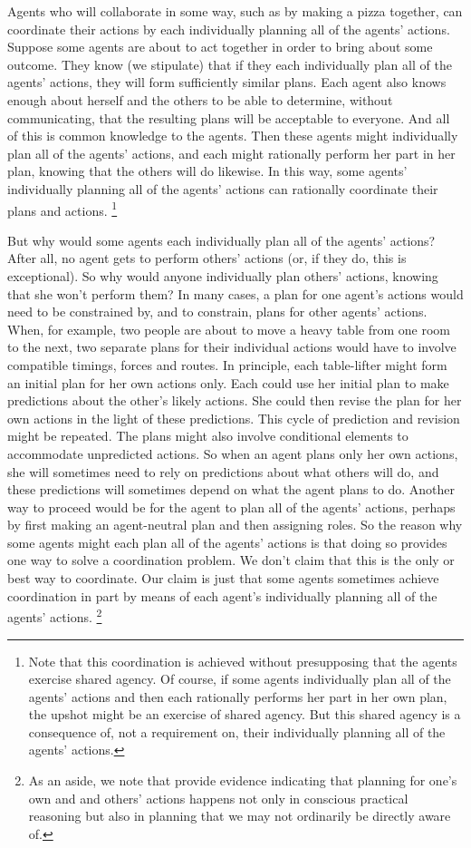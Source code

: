 \documentclass[12pt,\papersize]{extarticle}
\begin{document}
Agents who will collaborate in some way, such as by making a pizza together, can coordinate their actions by each individually planning all of the agents' actions.
Suppose some agents 
	 are about to act together in order to bring about some outcome.
They know (we stipulate) that if they each individually plan all of the agents' actions, they will form sufficiently similar plans.
Each agent also knows enough about herself and the others to be able to determine, without communicating, that the resulting plans will be acceptable to everyone. 
And all of this is common knowledge to the agents.  
Then these agents 
might individually plan all of the agents' actions,
and each might rationally perform her part in her plan, knowing that the others will do likewise.
In this way, 
 some agents' individually planning all of the agents' actions can rationally coordinate their plans and actions.%
\footnote{
Note that this coordination is achieved without presupposing that the agents exercise shared agency.
Of course,
	if some agents individually plan all of the agents' actions
	and then each rationally performs her part in her own plan,
	the upshot might be an exercise of shared agency.
But this shared agency is a consequence of, not a requirement on, their individually planning all of the agents' actions.
}


But why would some agents each individually plan all of the agents' actions?
After all, no agent gets  to perform  others' actions
(or, if they do, this is exceptional).
So why would anyone individually plan others' actions, knowing that she won't perform them?
In many cases, 
a plan for one agent's actions would need to be constrained by, and to constrain, plans for other agents' actions.
When, for example,
two people are about to move a heavy table from one room to the next,
two separate plans for their individual actions would have to involve compatible timings, forces and routes.
In principle,  each table-lifter might form an initial plan for her own actions only.
Each could use her initial plan to make predictions about the  other's likely actions.
She could then revise the plan for her own actions in the light of these predictions.
This cycle of prediction and revision might be repeated.
The plans might also involve conditional elements to accommodate unpredicted actions.
So when an agent plans only her own actions,
 she will sometimes need to rely on predictions about what others will do,
 and these predictions will sometimes depend on what the agent plans to do.
Another 
 way to proceed
	would be for the agent to plan all of the agents' actions,
perhaps by first making an agent-neutral plan and then assigning roles.
So the reason why some agents might each plan all of the agents' actions is that doing so provides one way to solve a coordination problem.
We don't claim that this is the only or best way to coordinate.
Our claim is just that some agents sometimes achieve coordination in part by means of each agent's individually planning all of the agents' actions.%
\footnote{
As an aside, we note that 
\citet{tsai:2011_groop_effect} provide evidence indicating that planning for one's own and and others' actions happens not only in conscious practical reasoning but also in planning that we may not ordinarily be directly aware of.
}
\end{document}
